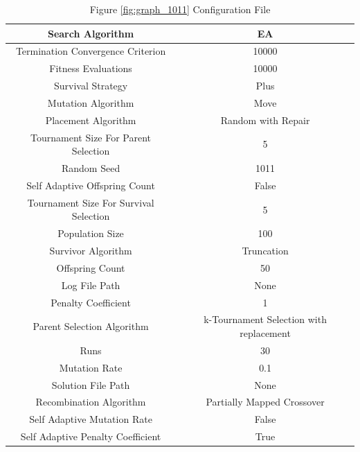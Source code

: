 \documentclass{standalone}
\begin{document}
\clearpage
\begin{table}[!htb]
	\centering
	\caption{Figure \ref{fig:graph_1011} Configuration File}
	\label{tab:graph_1011}
	\begin{tabular}{| c | c |}
		\hline
		Search Algorithm		& EA		 \\
		\hline
		Termination Convergence Criterion		& 10000		 \\
		\hline
		Fitness Evaluations		& 10000		 \\
		\hline
		Survival Strategy		& Plus		 \\
		\hline
		Mutation Algorithm		& Move		 \\
		\hline
		Placement Algorithm		& Random with Repair		 \\
		\hline
		Tournament Size For Parent Selection		& 5		 \\
		\hline
		Random Seed		& 1011		 \\
		\hline
		Self Adaptive Offspring Count		& False		 \\
		\hline
		Tournament Size For Survival Selection		& 5		 \\
		\hline
		Population Size		& 100		 \\
		\hline
		Survivor Algorithm		& Truncation		 \\
		\hline
		Offspring Count		& 50		 \\
		\hline
		Log File Path		& None		 \\
		\hline
		Penalty Coefficient		& 1		 \\
		\hline
		Parent Selection Algorithm		& k-Tournament Selection with replacement		 \\
		\hline
		Runs		& 30		 \\
		\hline
		Mutation Rate		& 0.1		 \\
		\hline
		Solution File Path		& None		 \\
		\hline
		Recombination Algorithm		& Partially Mapped Crossover		 \\
		\hline
		Self Adaptive Mutation Rate		& False		 \\
		\hline
		Self Adaptive Penalty Coefficient		& True		 \\
		\hline
	\end{tabular}
\end{table}
\end{document}
